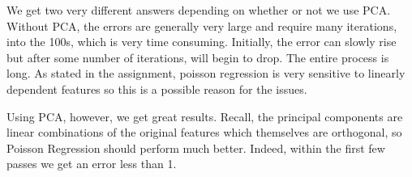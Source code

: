 \documentclass[12pt]{article}
\theoremstyle{plain}
\theoremstyle{definition}
\begin{document}
\begin{enumerate}
We get two very different answers depending on whether or not we use PCA. Without PCA, the errors are generally very large and require many iterations, into the 100s, which is very time consuming. Initially, the error can slowly rise but after some number of iterations, will begin to drop. The entire process is long. As stated in the assignment, poisson regression is very sensitive to linearly dependent features so this is a possible reason for the issues.

Using PCA, however, we get great results. Recall, the principal components are linear combinations of the original features which themselves are orthogonal, so Poisson Regression should perform much better. Indeed, within the first few passes we get an error less than 1. 




\end{enumerate}
\end{document}
